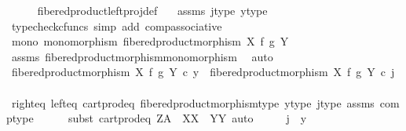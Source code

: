 \begin{isabellebody}
\ \ \ \ \isamarkupfalse%
\ fibered{\isacharunderscore}{\kern0pt}product{\isacharunderscore}{\kern0pt}left{\isacharunderscore}{\kern0pt}proj{\isacharunderscore}{\kern0pt}def\ \ \isamarkupfalse%
\ assms\ j{\isacharunderscore}{\kern0pt}type\ y{\isacharunderscore}{\kern0pt}type\isanewline
\ \ \ \ \isamarkupfalse%
\ {\isacharparenleft}{\kern0pt}typecheck{\isacharunderscore}{\kern0pt}cfuncs{\isacharcomma}{\kern0pt}\ simp\ add{\isacharcolon}{\kern0pt}\ comp{\isacharunderscore}{\kern0pt}associative{}{\isacharparenright}{\kern0pt}\isanewline
\isanewline
\ \ \isamarkupfalse%
\ mono{\isacharcolon}{\kern0pt}\ {\isachardoublequoteopen}monomorphism\ {\isacharparenleft}{\kern0pt}fibered{\isacharunderscore}{\kern0pt}product{\isacharunderscore}{\kern0pt}morphism\ X\ f\ g\ Y{\isacharparenright}{\kern0pt}{\isachardoublequoteclose}\isanewline
\ \ \ \ \isamarkupfalse%
\ assms\ fibered{\isacharunderscore}{\kern0pt}product{\isacharunderscore}{\kern0pt}morphism{\isacharunderscore}{\kern0pt}monomorphism\ \isamarkupfalse%
\ auto\isanewline
\isanewline
\ \ \isamarkupfalse%
\ {\isachardoublequoteopen}fibered{\isacharunderscore}{\kern0pt}product{\isacharunderscore}{\kern0pt}morphism\ X\ f\ g\ Y\ {\isasymcirc}\isactrlsub c\ y\ {\isacharequal}{\kern0pt}\ fibered{\isacharunderscore}{\kern0pt}product{\isacharunderscore}{\kern0pt}morphism\ X\ f\ g\ Y\ {\isasymcirc}\isactrlsub c\ j{\isachardoublequoteclose}\isanewline
\ \ \ \ \isamarkupfalse%
\ right{\isacharunderscore}{\kern0pt}eq\ left{\isacharunderscore}{\kern0pt}eq\ cart{\isacharunderscore}{\kern0pt}prod{\isacharunderscore}{\kern0pt}eq\ fibered{\isacharunderscore}{\kern0pt}product{\isacharunderscore}{\kern0pt}morphism{\isacharunderscore}{\kern0pt}type\ y{\isacharunderscore}{\kern0pt}type\ j{\isacharunderscore}{\kern0pt}type\ assms\ comp{\isacharunderscore}{\kern0pt}type\isanewline
\ \ \ \ \isamarkupfalse%
\ {\isacharparenleft}{\kern0pt}subst\ cart{\isacharunderscore}{\kern0pt}prod{\isacharunderscore}{\kern0pt}eq{\isacharbrackleft}{\kern0pt}\ Z{\isacharequal}{\kern0pt}A{\isacharcomma}{\kern0pt}\ \ X{\isacharequal}{\kern0pt}X{\isacharcomma}{\kern0pt}\ \ Y{\isacharequal}{\kern0pt}Y{\isacharbrackright}{\kern0pt}{\isacharcomma}{\kern0pt}\ auto{\isacharparenright}{\kern0pt}\isanewline
\ \ \isamarkupfalse%
\ \isamarkupfalse%
\ {\isachardoublequoteopen}j\ {\isacharequal}{\kern0pt}\ y{\isachardoublequoteclose}\isanewline

\end{isabellebody}

